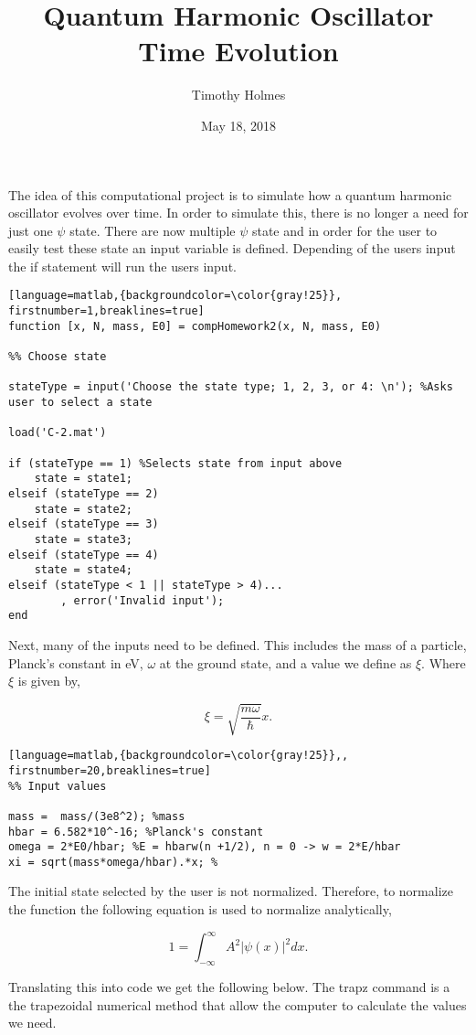 \documentclass{article}
\title{Quantum Harmonic Oscillator Time Evolution}
\author{Timothy Holmes}
\date{May 18, 2018}
\begin{document}
\maketitle

The idea of this computational project is to simulate how a quantum harmonic oscillator evolves over time. In order to simulate this, there is no longer a need for just one $\psi$ state. There are now multiple $\psi$ state and in order for the user to easily test these state an input variable is defined. Depending of the users input the if statement will run the users input.
\begin{lstlisting}[language=matlab,{backgroundcolor=\color{gray!25}}, firstnumber=1,breaklines=true]
function [x, N, mass, E0] = compHomework2(x, N, mass, E0)

%% Choose state

stateType = input('Choose the state type; 1, 2, 3, or 4: \n'); %Asks user to select a state

load('C-2.mat')

if (stateType == 1) %Selects state from input above
    state = state1;
elseif (stateType == 2) 
    state = state2;
elseif (stateType == 3) 
    state = state3;
elseif (stateType == 4) 
    state = state4;
elseif (stateType < 1 || stateType > 4)...
        , error('Invalid input'); 
end
\end{lstlisting}

Next, many of the inputs need to be defined. This includes the mass of a particle, Planck's constant in eV, $\omega$ at the ground state, and a value we define as $\xi$. Where $\xi$ is given by, 

$$
\xi = \sqrt{\frac{m\omega}{\hbar}}x.
$$

\begin{lstlisting}[language=matlab,{backgroundcolor=\color{gray!25}},, firstnumber=20,breaklines=true]
%% Input values

mass =  mass/(3e8^2); %mass
hbar = 6.582*10^-16; %Planck's constant
omega = 2*E0/hbar; %E = hbarw(n +1/2), n = 0 -> w = 2*E/hbar
xi = sqrt(mass*omega/hbar).*x; %
\end{lstlisting}

The initial state selected by the user is not normalized. Therefore, to normalize the function the following equation is used to normalize analytically,

$$
1 = \int_{-\infty}^{\infty} A^{2}|\psi(x)|^{2} dx.
$$

Translating this into code we get the following below. The trapz command is a the trapezoidal numerical method that allow the computer to calculate the values we need. 
\end{document}

